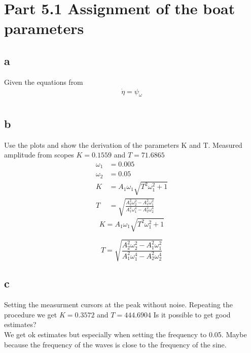 \section{Part 5.1 Assignment of the boat parameters}
\subsection{a}
Given the equations from 
\begin{subequations}
\begin{align}
    \Dot{\eta} = \psi_\omega\\
\end{align}
\end{subequations}
\subsection{b}
Use the plots and show the derivation of the parameters K and T. Measured amplitude from scopes
$K = 0.1559$ and $T = 71.6865$
\begin{align*}
    \omega_1 &= 0.005\\
    \omega_2 &= 0.05\\
    K &= A_1\omega_1\sqrt{T^2\omega_1^2+1}\\
    T &= \sqrt{\frac{A_2^2\omega_2^2-A_1^2\omega_1^2}{A_1^2\omega_1^4-A_2^2\omega_2^4}}
\end{align*}
$$K = A_1\omega_1\sqrt{T^2\omega_1^2+1}$$

$$T = \sqrt{\frac{A_2^2\omega_2^2-A_1^2\omega_1^2}{A_1^2\omega_1^4-A_2^2\omega_2^4}}$$

\subsection{c}
Setting the measurment cursors at the peak without noise. 
Repeating the procedure we get $K = 0.3572$ and $T = 444.6904$
Is it possible to get good estimates?\\
We get ok estimates but especially when setting the frequency to 0.05. Maybe because the frequency of the waves is close to the frequency of the sine. 